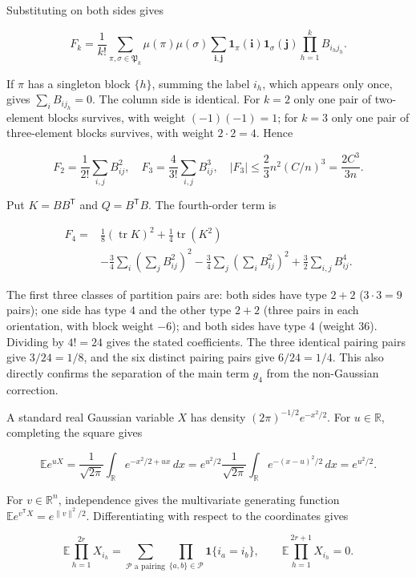 \documentclass[11pt,a4paper]{article}
\begin{document}
Substituting on both sides gives

\[
F_k=\frac1{k!}\sum_{\pi,\sigma\in\mathfrak P_k}\mu(\pi)\mu(\sigma)
\sum_{\boldsymbol i,\boldsymbol j}\mathbf1_\pi(\boldsymbol i)\mathbf1_\sigma(\boldsymbol j)
\prod_{h=1}^kB_{i_hj_h}.
\]

If \(\pi\) has a singleton block \(\{h\}\), summing the label \(i_h\), which appears only once, gives \(\sum_iB_{ij_h}=0\). The column side is identical. For \(k=2\) only one pair of two-element blocks survives, with weight \((-1)(-1)=1\); for \(k=3\) only one pair of three-element blocks survives, with weight \(2\cdot2=4\). Hence

\[
F_2=\frac1{2!}\sum_{i,j}B_{ij}^2,\quad
F_3=\frac4{3!}\sum_{i,j}B_{ij}^3,\quad
|F_3|\le\frac23n^2(C/n)^3=\frac{2C^3}{3n}.
\]

Put \(K=BB^{\mathsf T}\) and \(Q=B^{\mathsf T}B\). The fourth-order term is

\[
\begin{aligned}
F_4={}&\frac18(\operatorname{tr}K)^2+\frac14\operatorname{tr}(K^2)\\
&-\frac34\sum_i\left(\sum_jB_{ij}^2\right)^2
-\frac34\sum_j\left(\sum_iB_{ij}^2\right)^2
+\frac32\sum_{i,j}B_{ij}^4.
\end{aligned}
\]

The first three classes of partition pairs are: both sides have type \(2+2\) (\(3\cdot3=9\) pairs); one side has type \(4\) and the other type \(2+2\) (three pairs in each orientation, with block weight \(-6\)); and both sides have type \(4\) (weight \(36\)). Dividing by \(4!=24\) gives the stated coefficients. The three identical pairing pairs give \(3/24=1/8\), and the six distinct pairing pairs give \(6/24=1/4\). This also directly confirms the separation of the main term \(g_4\) from the non-Gaussian correction.

A standard real Gaussian variable \(X\) has density \((2\pi)^{-1/2}e^{-x^2/2}\). For \(u\in\mathbb R\), completing the square gives

\[
\mathbb Ee^{uX}=\frac1{\sqrt{2\pi}}\int_{\mathbb R}e^{-x^2/2+ux}\,dx
=e^{u^2/2}\frac1{\sqrt{2\pi}}\int_{\mathbb R}e^{-(x-u)^2/2}\,dx=e^{u^2/2}.
\]

For \(v\in\mathbb R^n\), independence gives the multivariate generating function \(\mathbb Ee^{v^{\mathsf T}X}=e^{\|v\|^2/2}\). Differentiating with respect to the coordinates gives

\[
\mathbb E\prod_{h=1}^{2r}X_{i_h}
=\sum_{\mathcal P\text{ a pairing}}\prod_{\{a,b\}\in\mathcal P}\mathbf1\{i_a=i_b\},
\qquad \mathbb E\prod_{h=1}^{2r+1}X_{i_h}=0.
\]
\end{document}

